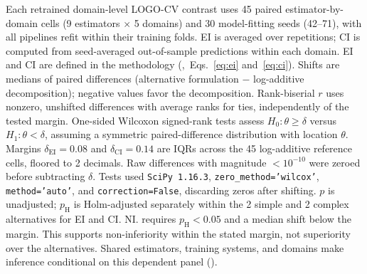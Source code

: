 \documentclass{article}
\begin{document}
\begin{table}[H]
\begin{minipage}{\linewidth}
Each retrained domain-level LOGO-CV contrast uses 45 paired estimator-by-domain cells (9 estimators $\times$ 5 domains) and 30 model-fitting seeds (42--71), with all pipelines refit within their training folds. EI is averaged over repetitions; CI is computed from seed-averaged out-of-sample predictions within each domain. EI and CI are defined in the methodology (,~Eqs.~\eqref{eq:ei} and~\eqref{eq:ci}). Shifts are medians of paired differences (alternative formulation $-$ log-additive decomposition); negative values favor the decomposition. Rank-biserial $r$ uses nonzero, unshifted differences with average ranks for ties, independently of the tested margin. One-sided Wilcoxon signed-rank tests assess $H_0:\theta\geq\delta$ versus $H_1:\theta<\delta$, assuming a symmetric paired-difference distribution with location $\theta$. Margins $\delta_{\mathrm{EI}} = 0.08$ and $\delta_{\mathrm{CI}} = 0.14$ are IQRs across the 45 log-additive reference cells, floored to 2 decimals. Raw differences with magnitude $<10^{-10}$ were zeroed before subtracting $\delta$. Tests used \texttt{SciPy 1.16.3}, \texttt{zero\_method='wilcox'}, \texttt{method='auto'}, and \texttt{correction=False}, discarding zeros after shifting. $p$ is unadjusted; $p_{\mathrm H}$ is Holm-adjusted separately within the 2 simple and 2 complex alternatives for EI and CI. NI. requires $p_{\mathrm H}<0.05$ and a median shift below the margin. This supports non-inferiority within the stated margin, not superiority over the alternatives. Shared estimators, training systems, and domains make inference conditional on this dependent panel ().
\end{minipage}
\end{table}
\end{document}
